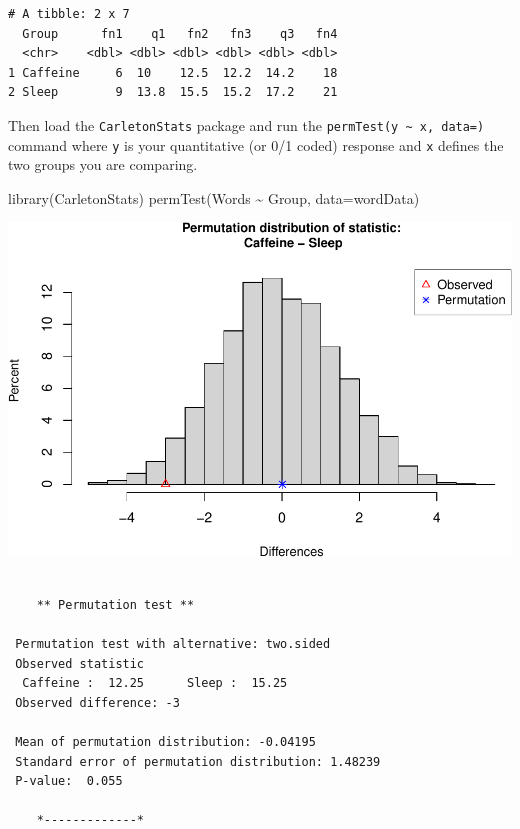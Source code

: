 \documentclass[
]{book}
\newenvironment{Shaded}{\begin{snugshade}}{\end{snugshade}}
\newcommand{\AttributeTok}[1]{\textcolor[rgb]{0.77,0.63,0.00}{#1}}
\newcommand{\FunctionTok}[1]{\textcolor[rgb]{0.00,0.00,0.00}{#1}}
\newcommand{\NormalTok}[1]{#1}
\newcommand{\SpecialCharTok}[1]{\textcolor[rgb]{0.00,0.00,0.00}{#1}}
\begin{document}
\begin{verbatim}
# A tibble: 2 x 7
  Group      fn1    q1   fn2   fn3    q3   fn4
  <chr>    <dbl> <dbl> <dbl> <dbl> <dbl> <dbl>
1 Caffeine     6  10    12.5  12.2  14.2    18
2 Sleep        9  13.8  15.5  15.2  17.2    21
\end{verbatim}

Then load the \texttt{CarletonStats} package and run the \texttt{permTest(y\ \textasciitilde{}\ x,\ data=)} command where \texttt{y} is your quantitative (or 0/1 coded) response and \texttt{x} defines the two groups you are comparing.

\begin{Shaded}
\begin{Highlighting}[]
\FunctionTok{library}\NormalTok{(CarletonStats)}
\FunctionTok{permTest}\NormalTok{(Words }\SpecialCharTok{\textasciitilde{}}\NormalTok{ Group, }\AttributeTok{data=}\NormalTok{wordData)}
\end{Highlighting}
\end{Shaded}

\includegraphics[width=1\linewidth]{Class_Activity_12_files/figure-latex/unnamed-chunk-3-1}

\begin{verbatim}

    ** Permutation test **

 Permutation test with alternative: two.sided 
 Observed statistic
  Caffeine :  12.25      Sleep :  15.25 
 Observed difference: -3 

 Mean of permutation distribution: -0.04195 
 Standard error of permutation distribution: 1.48239 
 P-value:  0.055 

    *-------------*
\end{verbatim}
\end{document}
